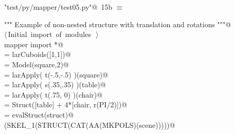 \documentclass[11pt,oneside]{article}	%
\begin{document}
\begin{flushleft} \small \label{scrap31}
\protect{}\verb@"test/py/mapper/test05.py"@\nobreak\ {\footnotesize 15b }$\equiv$
\vspace{-1ex}
\begin{list}{}{} \item
\mbox{}\verb@""" Example of non-nested structure with translation and rotations """@\\
\mbox{}\verb@@\hbox{$\langle\,$Initial import of modules\nobreak\ {\footnotesize {}}$\,\rangle$}\verb@@\\
\mbox{}\verb@from mapper import *@\\
\mbox{}\verb@square = larCuboids([1,1])@\\
\mbox{}\verb@square = Model(square,2)@\\
\mbox{}\verb@table = larApply( t(-.5,-.5) )(square)@\\
\mbox{}\verb@chair = larApply( s(.35,.35) )(table)@\\
\mbox{}\verb@chair = larApply( t(.75, 0) )(chair)@\\
\mbox{}\verb@struct = Struct([table] + 4*[chair, r(PI/2)])@\\
\mbox{}\verb@scene = evalStruct(struct)@\\
\mbox{}\verb@VIEW(SKEL_1(STRUCT(CAT(AA(MKPOLS)(scene)))))@\\
\mbox{}\verb@@{\NWsep}
\end{list}
\vspace{-2ex}
\end{flushleft}
\end{document}
